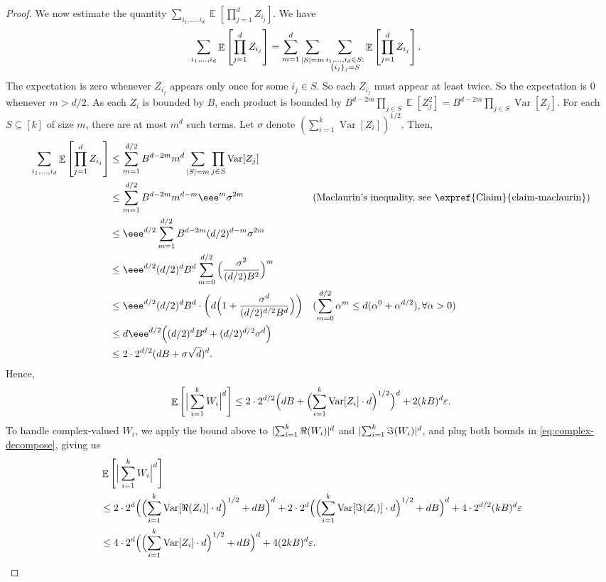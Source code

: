 \documentclass{toc}
\def\eps{\varepsilon}
\DeclarePairedDelimiter{\abs}{\lvert}{\rvert}
\DeclareMathOperator*{\E}{\mathbb{E}}                 %
\DeclareMathOperator*{\Var}{Var}                 %
\begin{document}
\begin{proof}
    We now estimate the quantity $\sum_{i_1, \ldots, i_d} \E \left[ \prod_{j = 1}^d Z_{i_j} \right]$.
    We have
    \begin{align*}
      \sum_{i_1, \ldots, i_d} \E \left[ \prod_{j = 1}^d Z_{i_j} \right]
      &= \sum_{m=1}^d \sum_{\abs{S} = m} \sum_{\substack{i_1, \ldots, i_d \in S: \\ \{i_j\}_j = S}} \E \left[ \prod_{j=1}^d Z_{i_j} \right] .
    \end{align*}
    The expectation is zero whenever $Z_{i_j}$ appears only once for some $i_j \in S$.
    So each $Z_{i_j}$ must appear at least twice.
    So the expectation is $0$ whenever $m > d/2$.
    As each $Z_i$ is bounded by $B$, each product is bounded by $B^{d - 2m} \prod_{j \in S} \E[Z_j^2] = B^{d - 2m} \prod_{j \in S} \Var[Z_j]$.
    For each $S \subseteq [k]$ of size $m$, there are at most $m^d$ such terms.
    Let $\sigma$ denote $(\sum_{i = 1}^k \Var[Z_i])^{1/2}$.
    Then,
    \begin{align*}
      \sum_{i_1, \ldots, i_d} \E \left[ \prod_{j = 1}^d Z_{i_j} \right]
      &\le \sum_{m=1}^{d/2} B^{d - 2m} m^d \sum_{\abs{S} = m} \prod_{j \in S} \Var[Z_j] &&\\
      &\le \sum_{m=1}^{d/2} B^{d - 2m} m^{d-m} \eee^m \sigma^{2m} && \text{(Maclaurin's inequality, see \expref{Claim}{claim-maclaurin})} \\
      &\le \eee^{d/2} \sum_{m=1}^{d/2} B^{d - 2m} (d/2)^{d - m} \sigma^{2m} \\
      &\le \eee^{d/2} (d/2)^d B^d \sum_{m=0}^{d/2} \Big( \frac{\sigma^2}{(d/2) B^2} \Big)^m \\
      &\le \eee^{d/2} (d/2)^d B^d \cdot \left(d \Big( 1 + \frac{\sigma^d}{(d/2)^{d/2} B^d} \Big) \right) && \text{($\sum_{m=0}^{d/2} \alpha^m \le d (\alpha^0 + \alpha^{d/2}), \forall \alpha > 0$)}\\
      &\le d \eee^{d/2} \Big( (d/2)^d B^d + (d/2)^{d/2} \sigma^d \Big) \\
      &\le 2 \cdot 2^{d/2} ( d B + \sigma \sqrt{d})^d .
    \end{align*}
    Hence,
    \[
      \E \left[ \Big| \sum_{i = 1}^k W_i \Big|^d \right]
      \le 2 \cdot 2^{d/2} \Bigl( dB + \Bigl( \sum_{i=1}^k \Var[Z_i] \cdot d \Bigr)^{1/2} \Bigr)^d + 2 (kB)^d \eps.
    \]
    To handle complex-valued $W_i$, we apply the bound above to $\abs{\sum_{i=1}^k \Re(W_i)}^d$ and $\abs{\sum_{i=1}^k \Im(W_i)}^d$, and plug both bounds in \eqref{eq:complex-decompose}, giving us
    \begin{align*}
      &\E \left[ \Big| \sum_{i=1}^k W_i \Big|^d \right] \\
      &\le 2 \cdot 2^d \Bigl( \Bigl( \sum_{i=1}^k \Var[\Re(Z_i)] \cdot d \Bigr)^{1/2} + d B \Bigr)^d + 2 \cdot 2^d \Bigl( \Bigl( \sum_{i=1}^k \Var[\Im(Z_i)] \cdot d \Bigr)^{1/2} + d B \Bigr)^d + 4 \cdot 2^{d/2} (kB)^d \eps \\
      &\le 4 \cdot 2^d \Bigl( \Bigl( \sum_{i=1}^k \Var[Z_i] \cdot d \Bigr)^{1/2} + d B \Bigr)^d + 4 (2kB)^d \eps . \qedhere
    \end{align*}
  \end{proof}
\end{document}
